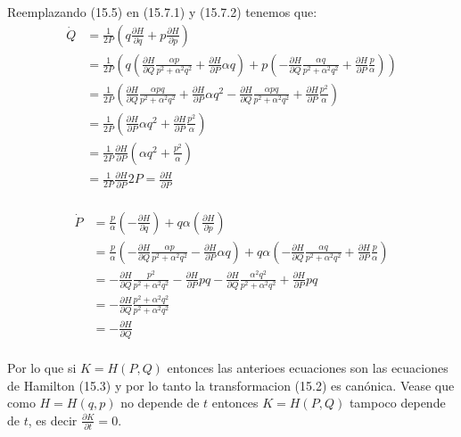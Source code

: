 \documentclass[a4paper]{article}
\begin{document}
\begin{answer}[Problema 1]
       

    Reemplazando (15.5) en (15.7.1) y (15.7.2) tenemos que:
    \begin{align*}
        \dot Q &= \frac 1 {2P}  \left( q\frac{\partial H}{\partial q} +  p \frac{\partial H}{\partial p} \right) \\
        &= \frac 1 {2P}  \left( q\left(\frac{\partial H}{\partial Q} \frac{\alpha p}{p^2 + \alpha^2 q^2} + \frac{\partial H}{\partial P} \alpha q\right) +  p \left(-\frac{\partial H}{\partial Q} \frac{\alpha q}{p^2 + \alpha^2 q^2}  + \frac{\partial H}{\partial P} \frac p\alpha \right) \right)\\
        &= \frac 1 {2P}  \left( \frac{\partial H}{\partial Q} \frac{\alpha pq}{p^2 + \alpha^2 q^2}  + \frac{\partial H}{\partial P} \alpha q^2 - \frac{\partial H}{\partial Q} \frac{\alpha pq}{p^2 + \alpha^2 q^2} + \frac{\partial H}{\partial P} \frac{p^2}{\alpha} \right)\\
        &= \frac 1 {2P}  \left( \frac{\partial H}{\partial P} \alpha q^2 + \frac{\partial H}{\partial P} \frac{p^2}{\alpha} \right)\\
        &= \frac 1 {2P}   \frac{\partial H}{\partial P} \left(\alpha q^2 + \frac{p^2}{\alpha} \right) \\
        &= \frac 1 {2P}   \frac{\partial H}{\partial P} 2P = \frac{\partial H}{\partial P}  \\
    \end{align*}

    \begin{align*}
        \dot P &= \frac{p}{\alpha} \left( -\frac{\partial H}{\partial q} \right) + q\alpha\left( \frac{\partial H}{\partial p} \right)\\
        &= \frac{p}{\alpha} \left( -\frac{\partial H}{\partial Q} \frac{\alpha p}{p^2 + \alpha^2 q^2}  - \frac{\partial H}{\partial P} \alpha q\right) + q\alpha\left( -\frac{\partial H}{\partial Q} \frac{\alpha q}{p^2 + \alpha^2 q^2}  + \frac{\partial H}{\partial P} \frac p\alpha \right)\\
        &=  -\frac{\partial H}{\partial Q} \frac{ p^2}{p^2 + \alpha^2 q^2}  - \frac{\partial H}{\partial P} pq  -\frac{\partial H}{\partial Q} \frac{\alpha^2 q^2}{p^2 + \alpha^2 q^2}  + \frac{\partial H}{\partial P} p q\\
        &=  -\frac{\partial H}{\partial Q} \frac{ p^2 + \alpha^2 q^2}{p^2 + \alpha^2 q^2} \\
        &=  -\frac{\partial H}{\partial Q} \\
    \end{align*}

    Por lo que si $K = H(P,Q)$ entonces las anterioes ecuaciones son las ecuaciones de Hamilton (15.3) y por lo tanto la transformacion (15.2) es canónica. Vease que como $H= H(q,p)$ no depende de $t$ entonces $K = H(P,Q)$ tampoco depende de $t$, es decir $\frac{\partial K}{\partial t} = 0$.

    \end{answer}
\end{document}
